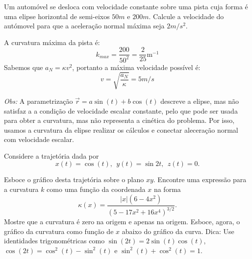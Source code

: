 \begin{exeresol}
Um automóvel se desloca com velocidade constante sobre uma pista cuja forma é uma elipse horizontal de semi-eixos $50m$ e $200m$. Calcule a velocidade do autómovel para que a aceleração normal máxima seja $2m/s^2$. 

\end{exeresol}
\begin{resol}
  A curvatura máxima da pista é:
  $$k_{max}=\frac{200}{50^2}=\frac{2}{25}\text{m}^{-1}$$
  Sabemos que $a_N=\kappa v^2$, portanto a máxima velocidade possível é:
  $$v=\sqrt{\frac{a_N}{\kappa}}=5m/s$$
  
  {\it Obs:} 
 A parametrização $\vec{r}=a\sin (t) + b\cos (t)$ descreve a elipse, mas não satisfaz a a condição de velocidade escalar constante, pelo que pode ser usada para obter a curvatura, mas não representa a cinética do problema. Por isso, usamos a curvatura da elipse realizar os cálculos e conectar aleceração normal com velocidade escalar. 
\end{resol}
\begin{exer}
Considere a trajetória  dada por
$$x(t)=\cos(t),~~  y(t)=\sin 2t,~~ z(t)=0.$$

Esboce o gráfico desta trajetória sobre o plano $xy$. Encontre uma expressão para a curvatura $k$ como uma função da coordenada $x$ na forma $$\kappa(x)=\frac{|x|(6-4x^2)}{\left(5-17x^2+16x^4\right)^{3/2}}.$$ Mostre que a curvatura é zero na origem e apenas na origem. Esboce, agora, o gráfico da curvatura como função de $x$ abaixo do gráfico da curva.
Dica: Use identidades trigonométricas como $\sin(2t)=2\sin(t)\cos(t)$, $\cos(2t)=\cos^2(t)-\sin^2(t)$ e $\sin^2(t)+\cos^2(t)=1$.
\end{exer}
